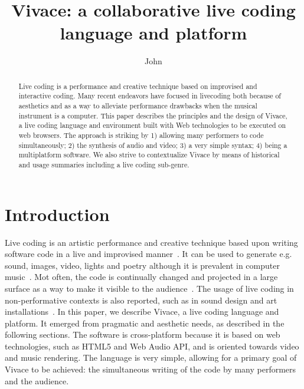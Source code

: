 \documentclass[12pt,times,twocolumn]{article}
\title{Vivace: a collaborative live coding language and platform}
\author{John\inst{1}}
\begin{document}
\maketitle

\begin{abstract}
Live coding is a performance and creative technique based on improvised and interactive coding.
Many recent endeavors have focused in livecoding both because of aesthetics
and as a way to alleviate performance drawbacks when the musical instrument is a computer.
This paper describes the principles and the design of Vivace, a live
coding language and environment built with Web technologies to be
executed on web browsers.
The approach is striking by 1) allowing many performers to code simultaneously;
2) the synthesis of audio and video;
3) a very simple syntax;
4) being a multiplatform software.
We also strive to contextualize Vivace by means
of historical and usage summaries including a live coding sub-genre. 
\end{abstract}

\section{Introduction} %
Live coding is an artistic performance and creative technique
based upon writing software code in a live and improvised manner~\cite{lc1}.
It can be used to generate e.g. sound, images, video, lights and poetry
although it is prevalent in computer music~\cite{lc2}.
Mot often, the code is continually changed and projected in a large surface as a way to
make it visible to the audience~\cite{lc3}.
The usage of live coding in non-performative contexts is also reported,
such as in sound design and art installations~\cite{lcN}.
In this paper, we describe Vivace, a live coding language and platform.
It emerged from pragmatic and aesthetic needs, as described in the following sections.
The software is cross-platform because it is based on web technologies,
such as HTML5 and Web Audio API, and is oriented towards video and music rendering.
The language is very simple, allowing for a primary goal of
Vivace to be achieved: the simultaneous writing of the code by many performers
and the audience.
\end{document}
